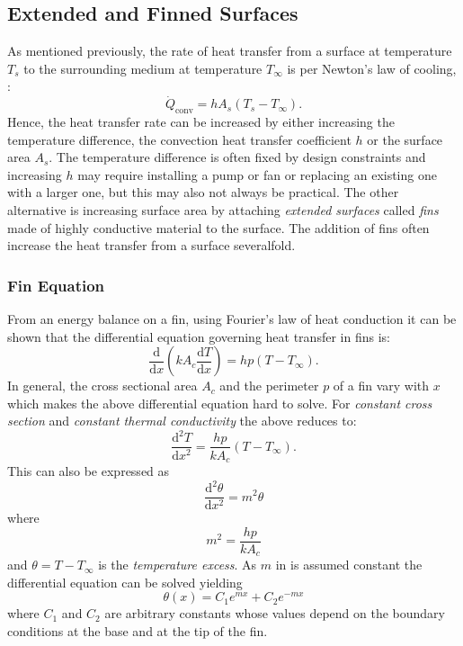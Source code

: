 \subsection{Extended and Finned Surfaces}
As mentioned previously, the rate of heat transfer from a surface at temperature $T_s$ to the surrounding medium at temperature $T_{\infty}$ is per Newton's law of cooling, :
\begin{equation*}
  \dot{Q}_{\text{conv}} = h A_s \left( T_s - T_{\infty} \right)
.\end{equation*}
Hence, the heat transfer rate can be increased by either increasing the temperature difference, the convection heat transfer coefficient $h$ or the surface area $A_s$.
The temperature difference is often fixed by design constraints and increasing $h$ may require installing a pump or fan or replacing an existing one with a larger one, but this may also not always be practical.
The other alternative is increasing surface area by attaching \textit{extended surfaces} called \textit{fins} made of highly conductive material to the surface.
The addition of fins often increase the heat transfer from a surface severalfold.

\subsubsection{Fin Equation}
From an energy balance on a fin, using Fourier's law of heat conduction it can be shown that the differential equation governing heat transfer in fins is:
\begin{equation*}
  \frac{\mathrm{d}}{\mathrm{d}x} \left( k A_c \frac{\mathrm{d}T}{\mathrm{d}x}  \right) = h p \left( T - T_{\infty} \right)
.\end{equation*}
In general, the cross sectional area $A_c$ and the perimeter $p$ of a fin vary with $x$ which makes the above differential equation hard to solve.
For \textit{constant cross section} and \textit{constant thermal conductivity} the above reduces to:
\begin{equation*}
  \frac{\mathrm{d}^2 T}{\mathrm{d}x^2} = \frac{h p}{k A_c} \left( T - T_{\infty} \right)
.\end{equation*}
This can also be expressed as
\begin{equation} \label{eq:reducedfinm}
  \frac{\mathrm{d}^2 \theta}{\mathrm{d}x^2} = m^2 \theta
\end{equation}
where
\begin{equation*}
  m^2 = \frac{hp}{k A_c}
\end{equation*}
and $\theta = T - T_{\infty}$ is the \textit{temperature excess}.
As $m$ in  is assumed constant the differential equation can be solved yielding
\begin{equation*}
  \theta(x) = C_1 e^{mx} + C_2 e^{-mx}
\end{equation*}
where $C_1$ and $C_2$ are arbitrary constants whose values depend on the boundary conditions at the base and at the tip of the fin.

